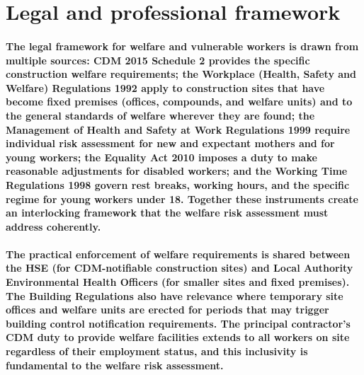 
\section{Legal and professional framework}

\paragraph{The legal framework for welfare and vulnerable workers is drawn from multiple sources: CDM 2015 Schedule 2 provides the specific construction welfare requirements; the Workplace (Health, Safety and Welfare) Regulations 1992 apply to construction sites that have become fixed premises (offices, compounds, and welfare units) and to the general standards of welfare wherever they are found; the Management of Health and Safety at Work Regulations 1999 require individual risk assessment for new and expectant mothers and for young workers; the Equality Act 2010 imposes a duty to make reasonable adjustments for disabled workers; and the Working Time Regulations 1998 govern rest breaks, working hours, and the specific regime for young workers under 18. Together these instruments create an interlocking framework that the welfare risk assessment must address coherently.}

\paragraph{The practical enforcement of welfare requirements is shared between the HSE (for CDM-notifiable construction sites) and Local Authority Environmental Health Officers (for smaller sites and fixed premises). The Building Regulations also have relevance where temporary site offices and welfare units are erected for periods that may trigger building control notification requirements. The principal contractor's CDM duty to provide welfare facilities extends to all workers on site regardless of their employment status, and this inclusivity is fundamental to the welfare risk assessment.}

